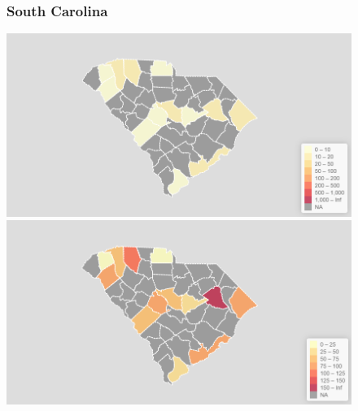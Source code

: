 \documentclass[11pt]{article}
\begin{document}
\begin{landscape}
\begin{figure}[h]
\subsubsection*{South Carolina}
\vfill
\hspace*{-3cm}
\begin{minipage}{.8\textwidth}
    \includegraphics[width=.95\textwidth]{ImageResults/SouthCarolinaTotal.PNG}
\end{minipage}%
\begin{minipage}{.8\textwidth}
    \includegraphics[width=.95\textwidth]{ImageResults/SouthCarolina100k.PNG}
\end{minipage}
\fillandplacepagenumber
\end{figure}
\end{landscape}
\end{document}
